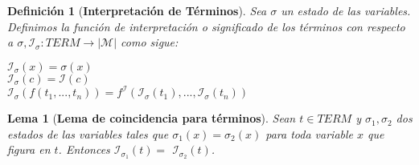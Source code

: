 \documentclass[letterpaper,12pt]{article}
\newtheorem{define}{Definición}[]
\newtheorem{lema}{Lema}[]
\begin{document}
    \begin{define}[\textbf{Interpretación de Términos}]
      Sea $\sigma$ un estado de las variables. Definimos la función de 
      interpretación o significado de los términos con respecto a
      $\sigma, \mathcal{I_{\sigma}}: TERM \rightarrow |\mathcal{M}|$
      como sigue:
      \begin{center}
          $\mathcal{I_{\sigma}}(x) = \sigma(x)$ \\
          $\mathcal{I_{\sigma}}(c) = \mathcal{I}(c)$ \\
          $\mathcal{I_{\sigma}}(f(t_{1},...,t_{n})) =
          f^{\mathcal{I}}(\mathcal{I_{\sigma}}(t_{1}),...,
          \mathcal{I_{\sigma}}(t_{n}))$                
      \end{center}
      
    \end{define}

    \begin{lema}[\textbf{Lema de coincidencia para términos}]
      Sean $t \in TERM$ y $\sigma_{1}, \sigma_{2}$ dos estados de las variables
      tales que $\sigma_{1}(x) = \sigma_{2}(x)$ para toda variable $x$ que 
      figura en $t$. Entonces $\mathcal{I}_{\sigma_{1}}(t) =$
      $\mathcal{I}_{\sigma_{2}}(t)$.
    \end{lema}

\end{document}

